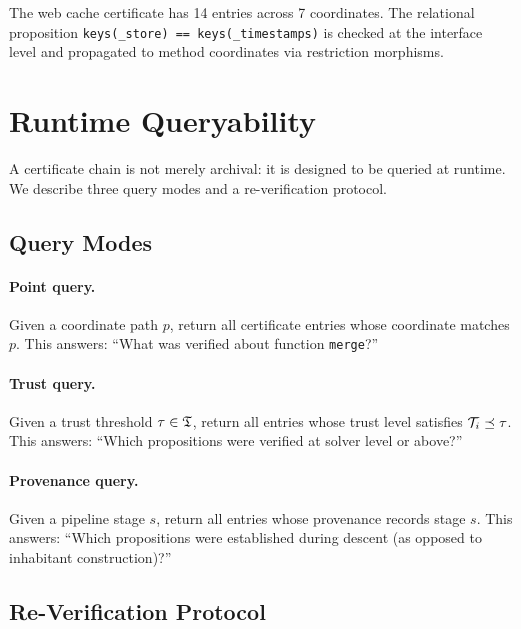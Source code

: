 \documentclass[11pt]{article}
\begin{document}
\begin{remark}
The web cache certificate has 14 entries across 7 coordinates.
The relational proposition \texttt{keys(\_store) == keys(\_timestamps)}
is checked at the interface level and propagated to method coordinates
via restriction morphisms.
\end{remark}

\section{Runtime Queryability}\label{sec:runtime}

A certificate chain is not merely archival: it is designed to be
queried at runtime.  We describe three query modes and a
re-verification protocol.

\subsection{Query Modes}

\paragraph{Point query.}
Given a coordinate path $p$, return all certificate entries whose
coordinate matches $p$.  This answers: ``What was verified about
function \texttt{merge}?''

\paragraph{Trust query.}
Given a trust threshold $\tau \in \mathfrak{T}$, return all entries whose
trust level satisfies $\mathcal{T}_i \preceq \tau$.  This answers: ``Which
propositions were verified at solver level or above?''

\paragraph{Provenance query.}
Given a pipeline stage $s$, return all entries whose provenance
records stage $s$.  This answers: ``Which propositions were
established during descent (as opposed to inhabitant construction)?''

\subsection{Re-Verification Protocol}
\end{document}
